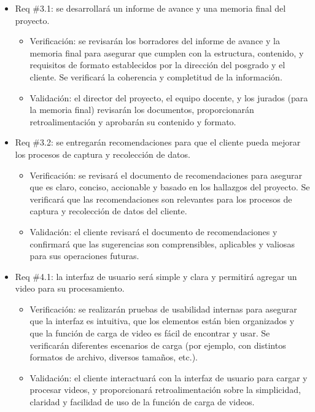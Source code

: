 \documentclass[
11pt, %
]{charter}
\begin{document}
\begin{itemize}
	\item Req \#3.1: se desarrollará un informe de avance y una memoria final del proyecto.
	\begin{itemize}
		\item Verificación: se revisarán los borradores del informe de avance y la memoria final para asegurar que cumplen con la estructura, contenido, y requisitos de formato establecidos por la dirección del posgrado y el cliente. Se verificará la coherencia y completitud de la información.
		\item Validación: el director del proyecto, el equipo docente, y los jurados (para la memoria final) revisarán los documentos, proporcionarán retroalimentación y aprobarán su contenido y formato. 
	\end{itemize}
	
	\item Req \#3.2: se entregarán recomendaciones para que el cliente pueda mejorar los procesos de captura y recolección de datos.
	\begin{itemize}
		\item Verificación: se revisará el documento de recomendaciones para asegurar que es claro, conciso, accionable y basado en los hallazgos del proyecto. Se verificará que las recomendaciones son relevantes para los procesos de captura y recolección de datos del cliente.
		\item Validación: el cliente revisará el documento de recomendaciones y confirmará que las sugerencias son comprensibles, aplicables y valiosas para sus operaciones futuras.
	\end{itemize}
	
	\item Req \#4.1: la interfaz de usuario será simple y clara y permitirá agregar un video para su procesamiento.
	\begin{itemize}
		\item Verificación: se realizarán pruebas de usabilidad internas para asegurar que la interfaz es intuitiva, que los elementos están bien organizados y que la función de carga de video es fácil de encontrar y usar. Se verificarán diferentes escenarios de carga (por ejemplo, con distintos formatos de archivo, diversos tamaños, etc.).
		\item Validación: el cliente interactuará con la interfaz de usuario para cargar y procesar videos, y proporcionará retroalimentación sobre la simplicidad, claridad y facilidad de uso de la función de carga de videos.
	\end{itemize}
	

\end{itemize}
\end{document}
